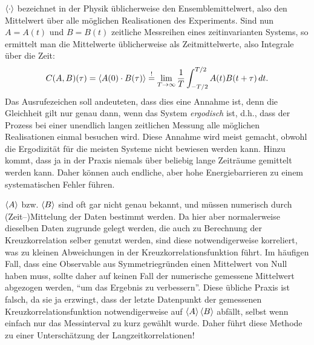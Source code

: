 $\left\langle{\cdot}\right\rangle$ bezeichnet in der Physik üblicherweise den
Ensemblemittelwert, also den Mittelwert über alle möglichen
Realisationen des Experiments. Sind nun $A=A(t)$ und $B=B(t)$
zeitliche Messreihen eines zeitinvarianten Systems, so ermittelt man
die Mittelwerte üblicherweise als Zeitmittelwerte, also Integrale über
die Zeit:
\begin{equation}
  \label{eq:crosscorrtime}
  C(A,B)(\tau) = \left\langle{A(0)\cdot B(\tau)}\right\rangle \stackrel{!}{=}
  \lim_{T\to\infty}\frac{1}{T}\int_{-T/2}^{T/2} A(t)B(t+\tau)\,dt.
\end{equation}
Das Ausrufezeichen soll andeuteten, dass dies eine Annahme ist, denn
die Gleichheit gilt nur genau dann, wenn das System \emph{ergodisch}
ist, d.h., dass der Prozess bei einer unendlich langen zeitlichen
Messung alle möglichen Realisationen einmal besuchen wird. Diese
Annahme wird meist gemacht, obwohl die Ergodizität für die meisten
Systeme nicht bewiesen werden kann. Hinzu kommt, dass ja in der Praxis
niemals über beliebig lange Zeiträume gemittelt werden kann. Daher
können auch endliche, aber hohe Energiebarrieren zu einem
systematischen Fehler führen.

$\left\langle{A}\right\rangle$ bzw. $\left\langle{B}\right\rangle$ sind oft gar nicht genau bekannt, und
müssen numerisch durch \mbox{(Zeit--)}Mittelung der Daten bestimmt
werden. Da hier aber normalerweise dieselben Daten zugrunde gelegt
werden, die auch zu Berechnung der Kreuzkorrelation selber genutzt
werden, sind diese notwendigerweise korreliert, was zu kleinen
Abweichungen in der Kreuzkorrelationsfunktion führt. Im häufigen Fall,
dass eine Observable aus Symmetriegründen einen Mittelwert von Null
haben muss, sollte daher auf keinen Fall der numerische gemessene
Mittelwert abgezogen werden, "`um das Ergebnis zu verbessern"'. Diese
übliche Praxis ist falsch, da sie ja erzwingt, dass der letzte
Datenpunkt der gemessenen Kreuzkorrelationsfunktion notwendigerweise
auf $\left\langle{A}\right\rangle\left\langle{B}\right\rangle$ abfällt, selbst wenn einfach nur das
Messinterval zu kurz gewählt wurde. Daher führt diese Methode zu einer
Unterschätzung der Langzeitkorrelationen!

